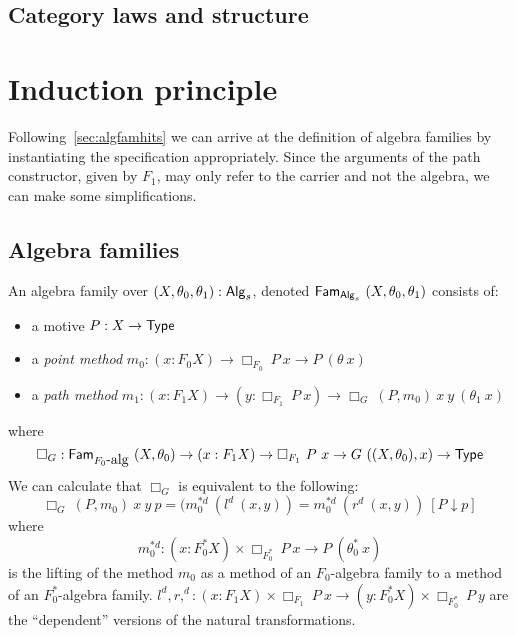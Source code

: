 \documentclass[a4paper,10pt]{report}
\begin{document}

\subsection{Category laws and structure}


\section{Induction principle}

Following~\cref{sec:algfamhits} we can arrive at the definition of
algebra families by instantiating the specification
appropriately. Since the arguments of the path constructor, given by
$F_1$, may only refer to the carrier and not the algebra, we can make
some simplifications.

\subsection{Algebra families}

\begin{defn}
  An algebra family over $(X,\theta_0,\theta_1) : \mathsf{Alg}_s$, denoted
  $\mathsf{Fam}_{\mathsf{Alg}_s}\ (X,\theta_0,\theta_1)$ consists of:

  \begin{itemize}
  \item a motive $P : X \to \mathsf{Type}$
  \item a \emph{point method} $m_0 : (x : F_0 X) \to \Box_{F_0}\  P\ x \to P\ (\theta\ x)$
  \item a \emph{path method} $m_1 : (x : F_1 X) \to (y : \Box_{F_1}\ P\ x) \to \Box_G\ (P,m_0)\ x\ y\ (\theta_1\ x)$
  \end{itemize}
\end{defn}
where
$$
\Box_G : \famover{\algcat{F_0}}{(X,\theta_0)} \to (x : F_1 X) \to \Box_{F_1}\ P\ x \to G\ ((X,\theta_0),x) \to \Type
$$
We can calculate that $\Box_G$ is equivalent to the following:
$$
\Box_G\ (P,m_0)\ x\ y\ p = (m_0^{*d}\ (l^d\ (x , y)) = m_0^{*d}\ (r^d\ (x , y))\ [ P \downarrow p ]
$$
where
$$
m_0^{*d} : (x : F_0^* X) \times \Box_{F_0^*}\ P\ x \to P\ (\theta_0^*\ x)
$$
is the lifting of the method $m_0$ as a method of an $F_0$-algebra
family to a method of an $F_0^*$-algebra family.
$l^d, r,^d : (x : F_1 X) \times \Box_{F_1}\ P\ x \to (y : F_0^* X)
\times \Box_{F_0^*}\ P\ y$
are the ``dependent'' versions of the natural transformations.
\end{document}
